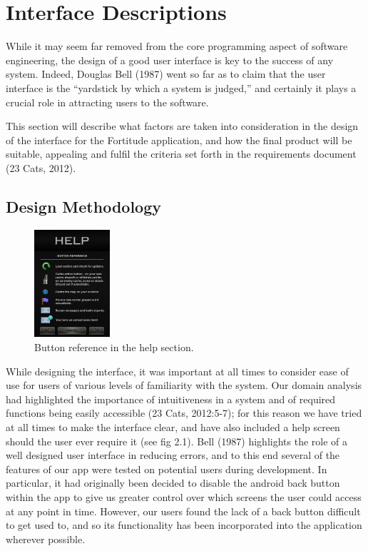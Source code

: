 \section{Interface Descriptions}
While it may seem far removed from the core programming aspect of software engineering, the design of a good user interface is key to the success of any system. Indeed, Douglas Bell (1987) went so far as to claim that the user interface is the “yardstick by which a system is judged,” and certainly it plays a crucial role in attracting users to the software.

This section will describe what factors are taken into consideration in the design of the interface for the Fortitude application, and how the final product will be suitable, appealing and fulfil the criteria set forth in the requirements document (23 Cats, 2012).

\subsection{Design Methodology}

\begin{figure}
	\vspace{-20pt}
	\begin{center}
	\includegraphics[width=0.25\textwidth]{images/help_mockup}
	\caption{Button reference in the help section.}
	\end{center}
	\vspace{20pt}
\end{figure}

While designing the interface, it was important at all times to consider ease of use for users of various levels of familiarity with the system. Our domain analysis had highlighted the importance of intuitiveness in a system and of required functions being easily accessible (23 Cats, 2012:5-7); for this reason we have tried at all times to make the interface clear, and have also included a help screen should the user ever require it (see fig 2.1). Bell (1987) highlights the role of a well designed user interface in reducing errors, and to this end several of the features of our app were tested on potential users during development. In particular, it had originally been decided to disable the android back button within the app to give us greater control over which screens the user could access at any point in time. However, our users found the lack of a back button difficult to get used to, and so its functionality has been incorporated into the application wherever possible.

